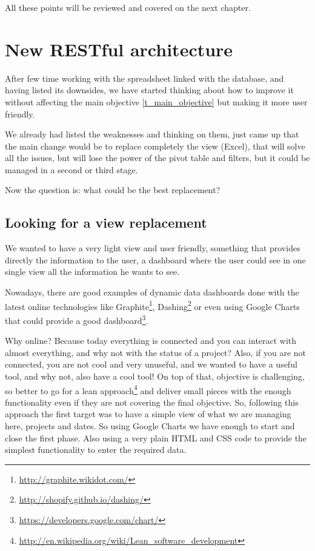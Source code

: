All these points will be reviewed and covered on the next chapter. 

\chapter{New RESTful architecture}
After few time working with the spreadsheet linked with the database, and having
listed its downsides, we have started thinking about how to improve it without
affecting the main objective \ref{t_main_objective} but making it more
user friendly.

We already had listed the weaknesses and thinking on them, just came
up that the main change would be to replace completely the view (Excel), that
will solve all the issues, but will lose the power of the pivot table and
filters, but it could be managed in a second or third stage.

Now the question is: what could be the best replacement?

\section{Looking for a view replacement}
We wanted to have a very light view and user friendly, something that
provides directly the information to the user, a dashboard where the user could
see in one single view all the information he wants to see.

Nowadays, there are good examples of dynamic data dashboards done with the
latest online technologies like
Graphite\footnote{\url{http://graphite.wikidot.com/}},
Dashing\footnote{\url{http://shopify.github.io/dashing/}} or even using Google
Charts that could provide a good
dashboard\footnote{\url{https://developers.google.com/chart/}}.  

Why online? Because today everything is connected and you can interact with
almost everything, and why not with the status of a project? Also, if you are
not connected, you are not cool and very unuseful, and we wanted to have a
useful tool, and why not, also have a cool tool!  On top of that, objective is
challenging, so better to go for a lean approach\footnote{\url{http://en.wikipedia.org/wiki/Lean\_software\_development}} and
deliver small pieces with the enough functionality even if they are not covering
the final objective. So, following this approach the first target was to have
a simple view of what we are managing here, projects and dates. So using Google
Charts we have enough to start and close the first phase. Also using a very
plain HTML and CSS code to provide the simplest functionality to enter the
required data.

